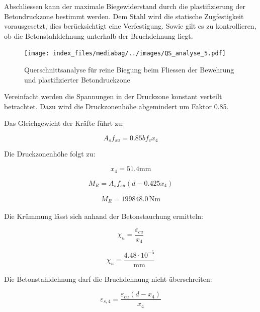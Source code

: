 \documentclass[
  12pt,
  letterpaper,
  egregdoesnotlikesansseriftitles]{scrreprt}
\begin{document}
Abschliessen kann der maximale Biegewiderstand durch die plastifizierung
der Betondruckzone bestimmt werden. Dem Stahl wird die statische
Zugfestigkeit vorausgesetzt, dies berücksichtigt eine Verfestigung.
Sowie gilt es zu kontrollieren, ob die Betonstahldehnung unterhalb der
Bruchdehnung liegt.

\begin{figure}[H]

{\centering \texttt{[image: index\_files/mediabag/../images/QS\_analyse\_5.pdf]}

}

\caption{\label{fig-qs5}Querschnittsanalyse für reine Biegung beim
Fliessen der Bewehrung und plastifizierter Betondruckzone}

\end{figure}

Vereinfacht werden die Spannungen in der Druckzone konstant verteilt
betrachtet. Dazu wird die Druckzonenhöhe abgemindert um Faktor 0.85.

Das Gleichgewicht der Kräfte führt zu:

\begin{equation}A_{s} f_{su} = 0.85 b f_{c} x_{4}\end{equation}

Die Druckzonenhöhe folgt zu:

\begin{equation}x_{4} = 51.4 \text{mm}\end{equation}

\begin{equation}M_{R} = A_{s} f_{su} \left(d - 0.425 x_{4}\right)\end{equation}

\begin{align}M_{R} = 199848.0 \, \mathrm{Nm} \end{align}

Die Krümmung lässt sich anhand der Betonstauchung ermitteln:

\begin{equation}\chi_{u} = \frac{\varepsilon_{cu}}{x_{4}}\end{equation}

\begin{equation}\chi_{u} = \frac{4.48 \cdot 10^{-5}}{\text{mm}}\end{equation}

Die Betonstahldehnung darf die Bruchdehnung nicht überschreiten:

\begin{equation}\varepsilon_{s,4} = \frac{\varepsilon_{cu} \left(d - x_{4}\right)}{x_{4}}\end{equation}
\end{document}
